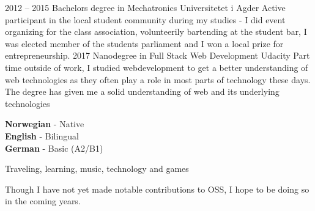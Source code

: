 \documentclass[9pt]{developercv} %
\begin{document}
\begin{entrylist}
	\entry
		{2012 -- 2015}
		{Bachelors degree in Mechatronics}
		{Universitetet i Agder}
    {Active participant in the local student community during my studies - I did event organizing for the class association, volunteerily bartending 
    at the student bar, I was elected member of the students parliament and I won a local
    prize for entrepreneurship.}
	\entry
		{2017}
		{Nanodegree in Full Stack Web Development}
		{Udacity}
		{Part time outside of work, I studied webdevelopment to get a better understanding
    of web technologies as they often play a role in most parts of technology these days.
    The degree has given me a solid understanding of web and its underlying technologies}
\end{entrylist}


\begin{minipage}[t]{0.3\textwidth}
	\vspace{-\baselineskip} %

	\textbf{Norwegian} - Native\\
	\textbf{English} - Bilingual\\
  \textbf{German} - Basic (A2/B1)\\
\end{minipage}
\hfill
\begin{minipage}[t]{0.3\textwidth}
	\vspace{-\baselineskip} %
	
	Traveling, learning, music, technology and games
\end{minipage}
\hfill
\begin{minipage}[t]{0.3\textwidth}
	\vspace{-\baselineskip} %
	
	Though I have not yet made notable contributions to OSS, I hope to be doing so
  in the coming years.
\end{minipage}

\end{document}

